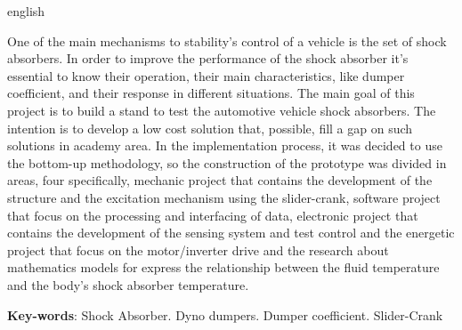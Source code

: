 \begin{resumo}[Abstract]
 \begin{otherlanguage*}{english}
 
One of the main mechanisms to stability's control of a vehicle is the set of shock absorbers. In order to improve the performance of the shock absorber it's essential to know their operation, their main characteristics, like dumper coefficient, and their response in different situations. The main goal of this project is to build a stand to test the automotive vehicle shock absorbers. The intention is to develop a low cost solution that, possible, fill a gap on such solutions in academy area. In the implementation process, it was decided to use the bottom-up methodology, so the construction of the prototype was divided in areas, four specifically, mechanic project that contains the development of the structure and the excitation mechanism using the slider-crank, software project that focus on the processing and interfacing of data, electronic project that contains the development of the sensing system and test control and the energetic project that focus on the motor/inverter drive and the research about mathematics models for express the relationship between the fluid temperature and the body's shock absorber temperature.


   \vspace{\onelineskip}
 
   \noindent 

\textbf{Key-words}: Shock Absorber. Dyno dumpers. Dumper coefficient. Slider-Crank

\end{otherlanguage*}
\end{resumo}